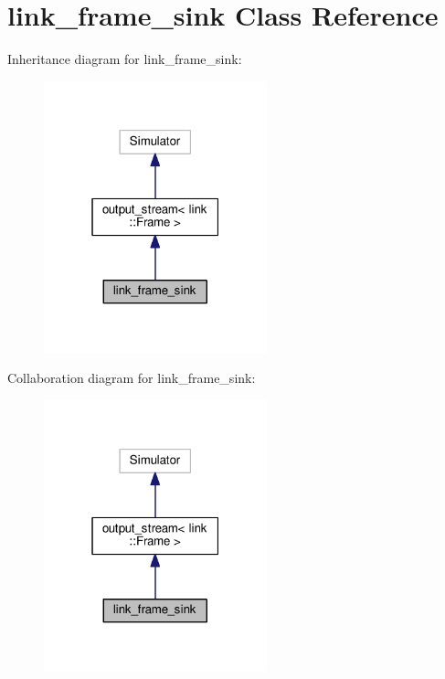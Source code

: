 \hypertarget{classlink__frame__sink}{}\section{link\+\_\+frame\+\_\+sink Class Reference}
\label{classlink__frame__sink}


Inheritance diagram for link\+\_\+frame\+\_\+sink\+:
\nopagebreak
\begin{figure}[H]
\begin{center}
\leavevmode
\includegraphics[width=183pt]{classlink__frame__sink__inherit__graph}
\end{center}
\end{figure}


Collaboration diagram for link\+\_\+frame\+\_\+sink\+:
\nopagebreak
\begin{figure}[H]
\begin{center}
\leavevmode
\includegraphics[width=183pt]{classlink__frame__sink__coll__graph}
\end{center}
\end{figure}

